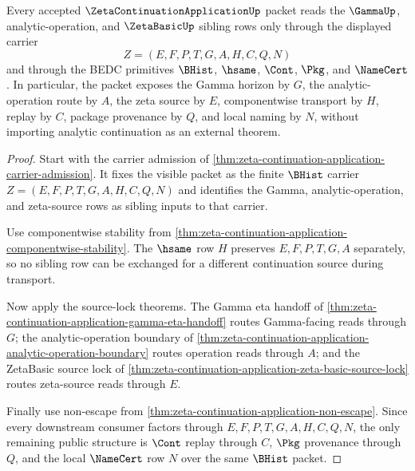 \begin{theorem}
\label{thm:zeta-continuation-application-primitive-scope-package}
Every accepted $\ZetaContinuationApplicationUp$ packet reads the $\GammaUp$, analytic-operation, and $\ZetaBasicUp$ sibling rows only through the displayed carrier
$$
Z=(E,F,P,T,G,A,H,C,Q,N)
$$
and through the BEDC primitives $\BHist$, $\hsame$, $\Cont$, $\Pkg$, and $\NameCert$. In particular, the packet exposes the Gamma horizon by $G$, the analytic-operation route by $A$, the zeta source by $E$, componentwise transport by $H$, replay by $C$, package provenance by $Q$, and local naming by $N$, without importing analytic continuation as an external theorem.
\end{theorem}
\begin{proof}
Start with the carrier admission of \autoref{thm:zeta-continuation-application-carrier-admission}. It fixes the visible packet as the finite $\BHist$ carrier $Z=(E,F,P,T,G,A,H,C,Q,N)$ and identifies the Gamma, analytic-operation, and zeta-source rows as sibling inputs to that carrier.

Use componentwise stability from \autoref{thm:zeta-continuation-application-componentwise-stability}. The $\hsame$ row $H$ preserves $E,F,P,T,G,A$ separately, so no sibling row can be exchanged for a different continuation source during transport.

Now apply the source-lock theorems. The Gamma eta handoff of \autoref{thm:zeta-continuation-application-gamma-eta-handoff} routes Gamma-facing reads through $G$; the analytic-operation boundary of \autoref{thm:zeta-continuation-application-analytic-operation-boundary} routes operation reads through $A$; and the ZetaBasic source lock of \autoref{thm:zeta-continuation-application-zeta-basic-source-lock} routes zeta-source reads through $E$.

Finally use non-escape from \autoref{thm:zeta-continuation-application-non-escape}. Since every downstream consumer factors through $E,F,P,T,G,A,H,C,Q,N$, the only remaining public structure is $\Cont$ replay through $C$, $\Pkg$ provenance through $Q$, and the local $\NameCert$ row $N$ over the same $\BHist$ packet.
\end{proof}

